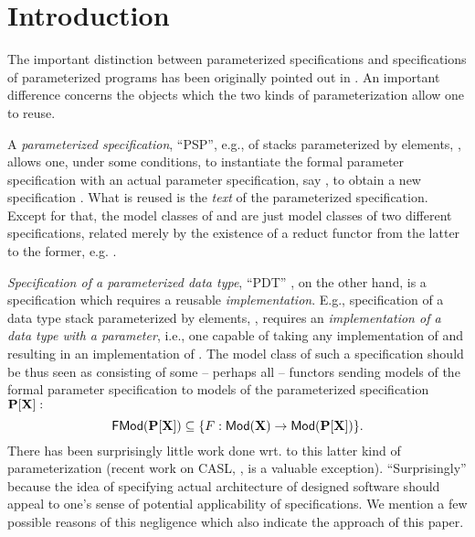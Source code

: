 \section{Introduction}
The important distinction between parameterized specifications and specifications
of parameterized programs has been originally pointed out in \cite{para}. An 
important difference concerns the objects which the two kinds of parameterization
allow one to reuse. 

A {\em parameterized specification}, ``PSP'', e.g., of stacks parameterized
by elements, , allows
one, under some conditions, to instantiate
the formal parameter specification  with an actual parameter specification, say , to
obtain a new specification . What is reused is the {\em text} of
the parameterized specification. Except for that, the model classes of 
and  are just model
classes of two different specifications, related merely by the existence of a
reduct functor from the latter to the former, 
e.g. \cite{Alge}.

{\em Specification of a parameterized data type}, ``PDT'' \cite{para,para1}, on the other hand, is a
specification which requires a reusable {\em implementation}. E.g.,
specification of a data type stack parameterized by elements, ,
requires an {\em implementation of a data type with a parameter}, i.e., one capable
of taking any implementation of  and resulting in an implementation of
. The model class of such a specification should be thus seen as
consisting of some -- perhaps all -- functors sending models of the formal
parameter specification  to models of the parameterized specification ${\bf P[X]}:$
\begin{equation}
{\sf {FMod}}({\bf P[X]}) \subseteq \{F:{\sf {Mod}}({\bf X})\to{\sf {Mod}}({\bf P[X]})\}. \label{eq:fsem}
\end{equation}
There has been surprisingly little work done wrt. to this latter kind of
parameterization (recent work on CASL, \cite{CASL}, is a valuable
exception). ``Surprisingly'' because the idea of specifying actual 
architecture of designed software should appeal to one's sense of potential
applicability of specifications. 
We mention a few possible reasons of this negligence which also indicate the
approach of this paper.

